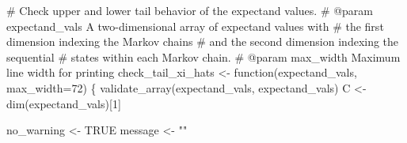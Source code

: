 \documentclass[
  letterpaper,
  DIV=11,
  numbers=noendperiod]{scrartcl}
\newenvironment{Shaded}{\begin{snugshade}}{\end{snugshade}}
\newcommand{\CommentTok}[1]{\textcolor[rgb]{0.37,0.37,0.37}{#1}}
\newcommand{\DecValTok}[1]{\textcolor[rgb]{0.68,0.00,0.00}{#1}}
\newcommand{\NormalTok}[1]{\textcolor[rgb]{0.00,0.23,0.31}{#1}}
\newcommand{\OperatorTok}[1]{\textcolor[rgb]{0.37,0.37,0.37}{#1}}
\newcommand{\StringTok}[1]{\textcolor[rgb]{0.13,0.47,0.30}{#1}}
\begin{document}
\begin{Shaded}
\begin{Highlighting}[]
\CommentTok{\# Check upper and lower tail behavior of the expectand values.}
\CommentTok{\# @param expectand\_vals A two{-}dimensional array of expectand values with}
\CommentTok{\#                       the first dimension indexing the Markov chains}
\CommentTok{\#                       and the second dimension indexing the sequential}
\CommentTok{\#                       states within each Markov chain.}
\CommentTok{\# @param max\_width Maximum line width for printing}
\NormalTok{check\_tail\_xi\_hats }\OperatorTok{\textless{}{-}}\NormalTok{ function(expectand\_vals, max\_width}\OperatorTok{=}\DecValTok{72}\NormalTok{) \{}
\NormalTok{  validate\_array(expectand\_vals, }\StringTok{\textquotesingle{}expectand\_vals\textquotesingle{}}\NormalTok{)}
\NormalTok{  C }\OperatorTok{\textless{}{-}}\NormalTok{ dim(expectand\_vals)[}\DecValTok{1}\NormalTok{]}
  
\NormalTok{  no\_warning }\OperatorTok{\textless{}{-}}\NormalTok{ TRUE}
\NormalTok{  message }\OperatorTok{\textless{}{-}} \StringTok{""}
  

\end{Highlighting}
\end{Shaded}
\end{document}
